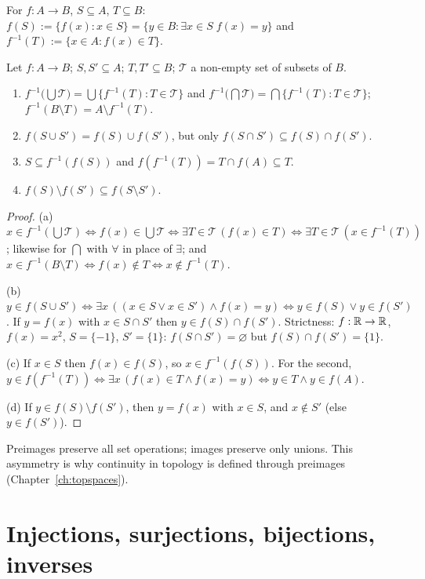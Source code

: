 \begin{definition}
	For $f:A\to B$, $S\subseteq A$, $T\subseteq B$: $f(S):=\{f(x):x\in S\}=\{y\in B:\exists x\in S\;f(x)=y\}$ and $f^{-1}(T):=\{x\in A:f(x)\in T\}$.
\end{definition}

\begin{theorem}\label{thm:imgpre}
	Let $f:A\to B$; $S,S'\subseteq A$; $T,T'\subseteq B$; $\mathcal T$ a non-empty set of subsets of $B$.
	\begin{enumerate}[label=(\alph*)]
		\item $f^{-1}\bigl(\bigcup\mathcal T\bigr)=\bigcup\{f^{-1}(T):T\in\mathcal T\}$ and $f^{-1}\bigl(\bigcap\mathcal T\bigr)=\bigcap\{f^{-1}(T):T\in\mathcal T\}$; $f^{-1}(B\setminus T)=A\setminus f^{-1}(T)$.
		\item $f(S\cup S')=f(S)\cup f(S')$, but only $f(S\cap S')\subseteq f(S)\cap f(S')$.
		\item $S\subseteq f^{-1}(f(S))$ and $f(f^{-1}(T))=T\cap f(A)\subseteq T$.
		\item $f(S)\setminus f(S')\subseteq f(S\setminus S')$.
	\end{enumerate}
\end{theorem}
\begin{proof}
	(a) $x\in f^{-1}(\bigcup\mathcal T)\iff f(x)\in\bigcup\mathcal T\iff\exists T\in\mathcal T\,(f(x)\in T)\iff\exists T\in\mathcal T\,(x\in f^{-1}(T))$; likewise for $\bigcap$ with $\forall$ in place of $\exists$; and $x\in f^{-1}(B\setminus T)\iff f(x)\notin T\iff x\notin f^{-1}(T)$.
	
	(b) $y\in f(S\cup S')\iff\exists x\,((x\in S\vee x\in S')\wedge f(x)=y)\iff y\in f(S)\vee y\in f(S')$. If $y=f(x)$ with $x\in S\cap S'$ then $y\in f(S)\cap f(S')$. Strictness: $f:\mathbb{R}\to\mathbb{R}$, $f(x)=x^2$, $S=\{-1\}$, $S'=\{1\}$: $f(S\cap S')=\varnothing$ but $f(S)\cap f(S')=\{1\}$.
	
	(c) If $x\in S$ then $f(x)\in f(S)$, so $x\in f^{-1}(f(S))$. For the second, $y\in f(f^{-1}(T))\iff\exists x\,(f(x)\in T\wedge f(x)=y)\iff y\in T\wedge y\in f(A)$.
	
	(d) If $y\in f(S)\setminus f(S')$, then $y=f(x)$ with $x\in S$, and $x\notin S'$ (else $y\in f(S')$).
\end{proof}

Preimages preserve all set operations; images preserve only unions. This asymmetry is why continuity in topology is defined through preimages (Chapter~\ref{ch:topspaces}).

\section{Injections, surjections, bijections, inverses}

